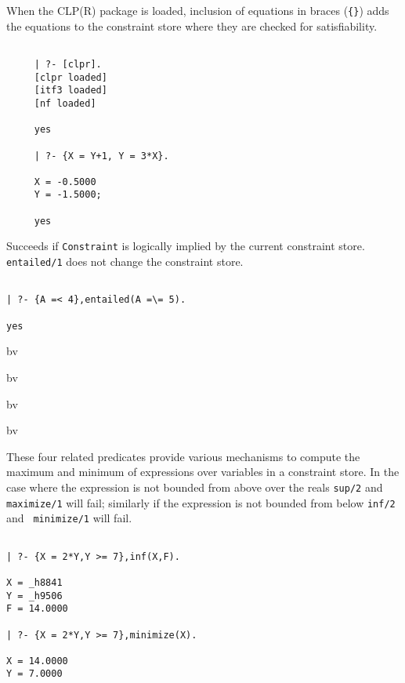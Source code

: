 \begin{description}
 {} 

When the CLP(R) package is loaded, inclusion of equations in braces
({\tt \{\}}) adds the equations to the constraint store where they are
checked for satisfiability.

{\small
\begin{verbatim}

     | ?- [clpr].
     [clpr loaded]
     [itf3 loaded]
     [nf loaded]

     yes

     | ?- {X = Y+1, Y = 3*X}.

     X = -0.5000
     Y = -1.5000;

     yes
\end{verbatim}
}

 {} 

Succeeds if {\tt Constraint} is logically implied by the current
constraint store.  {\tt entailed/1} does not change the constraint
store.

{\small
\begin{verbatim}

| ?- {A =< 4},entailed(A =\= 5).

yes   
\end{verbatim}
}

 {bv} 

 {bv} 

 {bv} 

 {bv} 

These four related predicates provide various mechanisms to compute
the maximum and minimum of expressions over variables in a constraint
store.  In the case where the expression is not bounded from above
over the reals {\tt sup/2} and {\tt maximize/1} will fail; similarly
if the expression is not bounded from below {\tt inf/2} and {\tt
minimize/1} will fail.

{\small
\begin{verbatim}

| ?- {X = 2*Y,Y >= 7},inf(X,F).

X = _h8841
Y = _h9506
F = 14.0000

| ?- {X = 2*Y,Y >= 7},minimize(X).

X = 14.0000
Y = 7.0000


\end{verbatim}}
\end{description}
